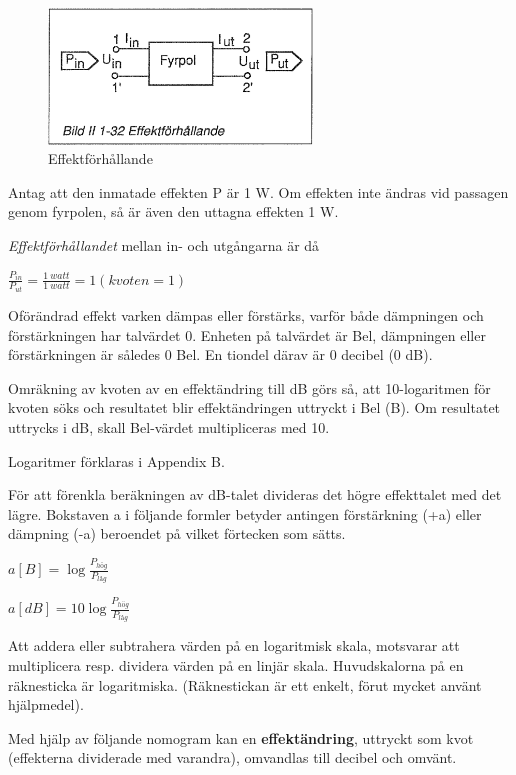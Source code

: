 \begin{figure}[th]
\begin{center}
\includegraphics[width=7cm]{images/bild_2_1-32}
\caption{Effektförhållande}
\label{fig:BildII1-32}
\end{center}
\end{figure}

Antag att den inmatade effekten P är 1 W. Om effekten inte ändras vid passagen
genom fyrpolen, så är även den uttagna effekten 1 W.

\emph{Effektförhållandet} mellan in- och utgångarna är då

\(\frac{P_{in}}{P_{ut}} = \frac{1\ watt}{1\ watt} = 1 (kvoten = 1)\)

Oförändrad effekt varken dämpas eller förstärks, varför både dämpningen och
förstärkningen har talvärdet 0. Enheten på talvärdet är Bel, dämpningen eller
förstärkningen är således 0 Bel. En tiondel därav är 0 decibel (0 dB).

Omräkning av kvoten av en effektändring till dB görs så, att 10-logaritmen för
kvoten söks och resultatet blir effektändringen uttryckt i Bel (B). Om
resultatet uttrycks i dB, skall Bel-värdet multipliceras med 10.

Logaritmer förklaras i Appendix B.

För att förenkla beräkningen av dB-talet divideras det högre effekttalet med det
lägre. Bokstaven a i följande formler betyder antingen förstärkning (+a) eller
dämpning (-a) beroendet på vilket förtecken som sätts.

\(a[B] = \log \frac{P_{hög}}{P_{låg}}\)

\(a[dB] = 10\log \frac{P_{hög}}{P_{låg}}\)

Att addera eller subtrahera värden på en logaritmisk skala, motsvarar att
multiplicera resp. dividera värden på en linjär skala. Huvudskalorna på en
räknesticka är logaritmiska. (Räknestickan är ett enkelt, förut mycket använt
hjälpmedel).

Med hjälp av följande nomogram kan en \textbf{effektändring}, uttryckt som kvot
(effekterna dividerade med varandra), omvandlas till decibel och omvänt.

